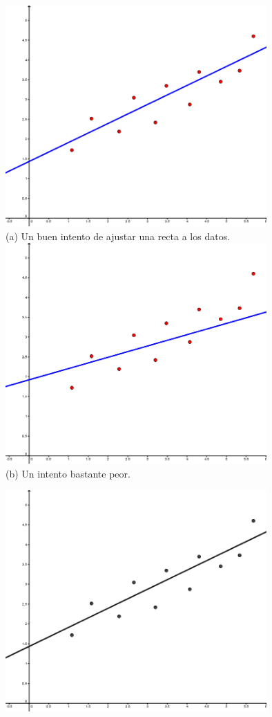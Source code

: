 \begin{figure}[htbp]
\begin{center}
\begin{enColor}
\includegraphics[width=10cm]{../fig/Cap10-RectaRegresionBuenIntento.png}\\
(a) Un buen intento de ajustar una recta a los datos.\\
\includegraphics[width=10cm]{../fig/Cap10-RectaRegresionMalIntento.png}\\
(b) Un intento bastante peor.
\end{enColor}
\begin{bn}
\includegraphics[width=10cm]{../fig/Cap10-RectaRegresionBuenIntento-bn.png}\\

\end{bn}
\end{center}
\end{figure}

